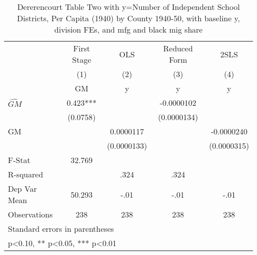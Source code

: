 \begin{table}[htbp]\centering
\def\sym#1{\ifmmode^{#1}\else\(^{#1}\)\fi}
\caption{Dererencourt Table Two with y=Number of Independent School Districts, Per Capita (1940) by County 1940-50, with baseline y, division FEs, and mfg and black mig share}
\begin{tabular}{l*{4}{c}}
\toprule
                    & First Stage   &         OLS   &Reduced Form   &        2SLS   \\
                    &\multicolumn{1}{c}{(1)}&\multicolumn{1}{c}{(2)}&\multicolumn{1}{c}{(3)}&\multicolumn{1}{c}{(4)}\\
                    &\multicolumn{1}{c}{GM}&\multicolumn{1}{c}{y}&\multicolumn{1}{c}{y}&\multicolumn{1}{c}{y}\\
\midrule
$\hat{GM}$          &       0.423***&               &  -0.0000102   &               \\
                    &    (0.0758)   &               & (0.0000134)   &               \\
\addlinespace
GM                  &               &   0.0000117   &               &  -0.0000240   \\
                    &               & (0.0000133)   &               & (0.0000315)   \\
\midrule
F-Stat              &      32.769   &               &               &               \\
R-squared           &               &        .324   &        .324   &               \\
Dep Var Mean        &      50.293   &        -.01   &        -.01   &        -.01   \\
Observations        &         238   &         238   &         238   &         238   \\
\bottomrule
\multicolumn{5}{l}{\footnotesize Standard errors in parentheses}\\
\multicolumn{5}{l}{\footnotesize * p<0.10, ** p<0.05, *** p<0.01}\\
\end{tabular}
\end{table}
